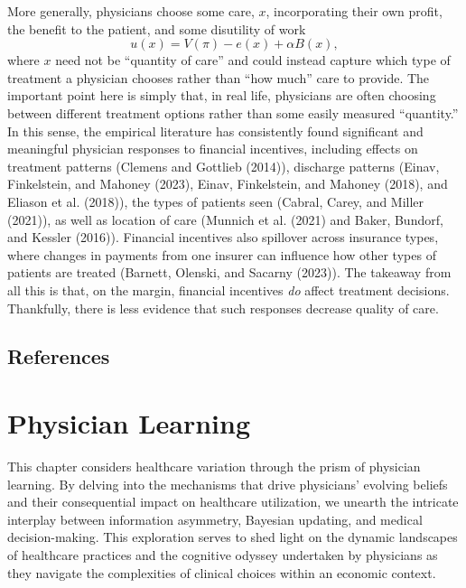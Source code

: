 \documentclass[
  letterpaper,
  DIV=11,
  numbers=noendperiod]{scrreport}
\theoremstyle{definition}
\theoremstyle{remark}
\begin{document}
More generally, physicians choose some care, \(x\), incorporating their
own profit, the benefit to the patient, and some disutility of work
\[u(x) = V(\pi) -e(x) + \alpha B(x),\] where \(x\) need not be
``quantity of care'' and could instead capture which type of treatment a
physician chooses rather than ``how much'' care to provide. The
important point here is simply that, in real life, physicians are often
choosing between different treatment options rather than some easily
measured ``quantity.'' In this sense, the empirical literature has
consistently found significant and meaningful physician responses to
financial incentives, including effects on treatment patterns (Clemens
and Gottlieb (2014)), discharge patterns (Einav, Finkelstein, and
Mahoney (2023), Einav, Finkelstein, and Mahoney (2018), and Eliason et
al. (2018)), the types of patients seen (Cabral, Carey, and Miller
(2021)), as well as location of care (Munnich et al. (2021) and Baker,
Bundorf, and Kessler (2016)). Financial incentives also spillover across
insurance types, where changes in payments from one insurer can
influence how other types of patients are treated (Barnett, Olenski, and
Sacarny (2023)). The takeaway from all this is that, on the margin,
financial incentives \emph{do} affect treatment decisions. Thankfully,
there is less evidence that such responses decrease quality of care.

\hypertarget{references-2}{%
\section*{References}\label{references-2}}


\hypertarget{physician-learning}{%
\chapter{Physician Learning}\label{physician-learning}}

This chapter considers healthcare variation through the prism of
physician learning. By delving into the mechanisms that drive
physicians' evolving beliefs and their consequential impact on
healthcare utilization, we unearth the intricate interplay between
information asymmetry, Bayesian updating, and medical decision-making.
This exploration serves to shed light on the dynamic landscapes of
healthcare practices and the cognitive odyssey undertaken by physicians
as they navigate the complexities of clinical choices within an economic
context.
\end{document}
